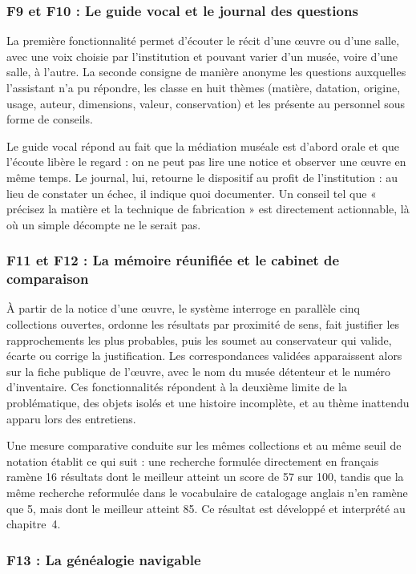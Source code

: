 \subsubsection{F9 et F10 : Le guide vocal et le journal des questions}

La première fonctionnalité permet d'écouter le récit d'une œuvre ou d'une salle,
avec une voix choisie par l'institution et pouvant varier d'un musée, voire
d'une salle, à l'autre. La seconde consigne de manière anonyme les questions
auxquelles l'assistant n'a pu répondre, les classe en huit thèmes (matière,
datation, origine, usage, auteur, dimensions, valeur, conservation) et les
présente au personnel sous forme de conseils.

Le guide vocal répond au fait que la médiation muséale est d'abord orale et que
l'écoute libère le regard : on ne peut pas lire une notice et observer une œuvre
en même temps. Le journal, lui, retourne le dispositif au profit de
l'institution : au lieu de constater un échec, il indique quoi documenter. Un
conseil tel que « précisez la matière et la technique de fabrication » est
directement actionnable, là où un simple décompte ne le serait pas.

\subsubsection{F11 et F12 : La mémoire réunifiée et le cabinet de comparaison}

À partir de la notice d'une œuvre, le système interroge en parallèle cinq
collections ouvertes, ordonne les résultats par proximité de sens, fait
justifier les rapprochements les plus probables, puis les soumet au conservateur
qui valide, écarte ou corrige la justification. Les correspondances validées
apparaissent alors sur la fiche publique de l'œuvre, avec le nom du musée
détenteur et le numéro d'inventaire. Ces fonctionnalités répondent à la deuxième
limite de la problématique, des objets isolés et une histoire incomplète, et au
thème inattendu apparu lors des entretiens.

Une mesure comparative conduite sur les mêmes collections et au même seuil de
notation établit ce qui suit : une recherche formulée directement en français
ramène 16 résultats dont le meilleur atteint un score de 57 sur 100, tandis que
la même recherche reformulée dans le vocabulaire de catalogage anglais n'en
ramène que 5, mais dont le meilleur atteint 85. Ce résultat est développé et
interprété au chapitre~4.

\subsubsection{F13 : La généalogie navigable}

